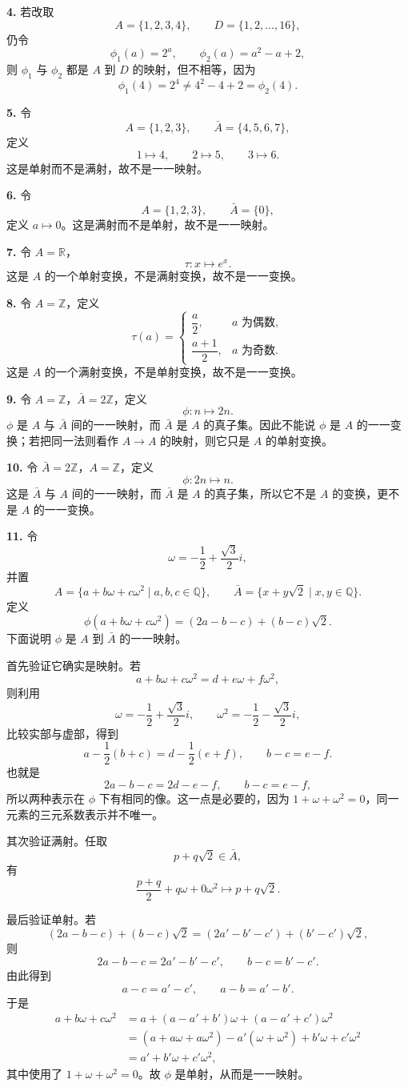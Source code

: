 \textbf{4.} 若改取
\[
A=\{1,2,3,4\},\qquad D=\{1,2,\ldots,16\},
\]
仍令
\[
\phi_1(a)=2^a,\qquad \phi_2(a)=a^2-a+2,
\]
则 $\phi_1$ 与 $\phi_2$ 都是 $A$ 到 $D$ 的映射，但不相等，因为
\[
\phi_1(4)=2^4\ne4^2-4+2=\phi_2(4).
\]

\textbf{5.} 令
\[
A=\{1,2,3\},\qquad \bar A=\{4,5,6,7\},
\]
定义
\[
1\mapsto4,
\qquad2\mapsto5,
\qquad3\mapsto6.
\]
这是单射而不是满射，故不是一一映射。

\textbf{6.} 令
\[
A=\{1,2,3\},\qquad \bar A=\{0\},
\]
定义 $a\mapsto0$。这是满射而不是单射，故不是一一映射。

\textbf{7.} 令 $A=\mathbb R$，
\[
\tau:x\longmapsto e^x.
\]
这是 $A$ 的一个单射变换，不是满射变换，故不是一一变换。

\textbf{8.} 令 $A=\mathbb Z$，定义
\[
\tau(a)=
\begin{cases}
\dfrac a2,&a\text{ 为偶数},\\[4pt]
\dfrac{a+1}{2},&a\text{ 为奇数}.
\end{cases}
\]
这是 $A$ 的一个满射变换，不是单射变换，故不是一一变换。

\textbf{9.} 令 $A=\mathbb Z$，$\bar A=2\mathbb Z$，定义
\[
\phi:n\longmapsto2n.
\]
$\phi$ 是 $A$ 与 $\bar A$ 间的一一映射，而 $\bar A$ 是 $A$ 的真子集。因此不能说 $\phi$ 是 $A$ 的一一变换；若把同一法则看作 $A\to A$ 的映射，则它只是 $A$ 的单射变换。

\textbf{10.} 令 $\bar A=2\mathbb Z$，$A=\mathbb Z$，定义
\[
\phi:2n\longmapsto n.
\]
这是 $\bar A$ 与 $A$ 间的一一映射，而 $\bar A$ 是 $A$ 的真子集，所以它不是 $A$ 的变换，更不是 $A$ 的一一变换。

\textbf{11.} 令
\[
\omega=-\frac12+\frac{\sqrt3}{2}i,
\]
并置
\[
A=\{a+b\omega+c\omega^2\mid a,b,c\in\mathbb Q\},
\qquad
\bar A=\{x+y\sqrt2\mid x,y\in\mathbb Q\}.
\]
定义
\[
\phi(a+b\omega+c\omega^2)=(2a-b-c)+(b-c)\sqrt2.
\]
下面说明 $\phi$ 是 $A$ 到 $\bar A$ 的一一映射。

首先验证它确实是映射。若
\[
a+b\omega+c\omega^2=d+e\omega+f\omega^2,
\]
则利用
\[
\omega=-\frac12+\frac{\sqrt3}{2}i,
\qquad
\omega^2=-\frac12-\frac{\sqrt3}{2}i,
\]
比较实部与虚部，得到
\[
a-\frac12(b+c)=d-\frac12(e+f),
\qquad
b-c=e-f.
\]
也就是
\[
2a-b-c=2d-e-f,
\qquad
b-c=e-f,
\]
所以两种表示在 $\phi$ 下有相同的像。这一点是必要的，因为 $1+\omega+\omega^2=0$，同一元素的三元系数表示并不唯一。

其次验证满射。任取
\[
p+q\sqrt2\in\bar A,
\]
有
\[
\frac{p+q}{2}+q\omega+0\omega^2
\longmapsto p+q\sqrt2.
\]

最后验证单射。若
\[
(2a-b-c)+(b-c)\sqrt2=(2a'-b'-c')+(b'-c')\sqrt2,
\]
则
\[
2a-b-c=2a'-b'-c',
\qquad
b-c=b'-c'.
\]
由此得到
\[
a-c=a'-c',
\qquad
 a-b=a'-b'.
\]
于是
\begin{align*}
a+b\omega+c\omega^2
&=a+(a-a'+b')\omega+(a-a'+c')\omega^2\\
&=(a+a\omega+a\omega^2)-a'(\omega+\omega^2)+b'\omega+c'\omega^2\\
&=a'+b'\omega+c'\omega^2,
\end{align*}
其中使用了 $1+\omega+\omega^2=0$。故 $\phi$ 是单射，从而是一一映射。

